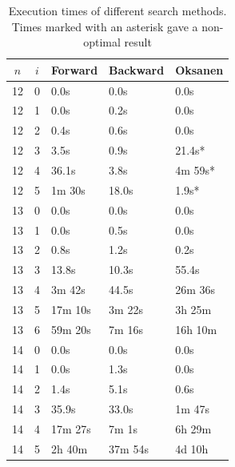 \documentclass[twoside,leqno,twocolumn]{article}
\begin{document}
\begin{table}[!t]
  \renewcommand{\arraystretch}{1.2}
  \caption{Execution times of different search methods. Times marked with an asterisk gave a non-optimal result}
  \label{table:search_algorithms}
  \centering
  \begin{tabular}{c|c|l|l|l}
    $n$ & $i$ & \textbf{Forward} & \textbf{Backward} & \textbf{Oksanen} \\
    \hline
    12  & 0   & 0.0s             & 0.0s              & 0.0s             \\
    12  & 1   & 0.0s             & 0.2s              & 0.0s             \\
    12  & 2   & 0.4s             & 0.6s              & 0.0s             \\
    12  & 3   & 3.5s             & 0.9s              & 21.4s*           \\
    12  & 4   & 36.1s            & 3.8s              & 4m 59s*          \\
    12  & 5   & 1m 30s           & 18.0s             & 1.9s*            \\
    \hline
    13  & 0   & 0.0s             & 0.0s              & 0.0s             \\
    13  & 1   & 0.0s             & 0.5s              & 0.0s             \\
    13  & 2   & 0.8s             & 1.2s              & 0.2s             \\
    13  & 3   & 13.8s            & 10.3s             & 55.4s            \\
    13  & 4   & 3m 42s           & 44.5s             & 26m 36s          \\
    13  & 5   & 17m 10s          & 3m 22s            & 3h 25m           \\
    13  & 6   & 59m 20s          & 7m 16s            & 16h 10m          \\
    \hline
    14  & 0   & 0.0s             & 0.0s              & 0.0s             \\
    14  & 1   & 0.0s             & 1.3s              & 0.0s             \\
    14  & 2   & 1.4s             & 5.1s              & 0.6s             \\
    14  & 3   & 35.9s            & 33.0s             & 1m 47s           \\
    14  & 4   & 17m 27s          & 7m 1s             & 6h 29m           \\
    14  & 5   & 2h 40m           & 37m 54s           & 4d 10h           \\

\end{tabular}
\end{table}
\end{document}
